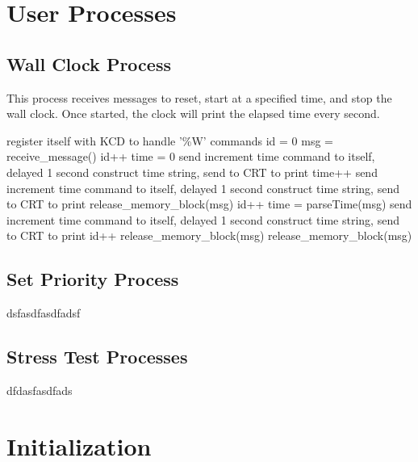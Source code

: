 \documentclass[12pt]{report}
\begin{document}
\section{User Processes}

\subsection{Wall Clock Process}

This process receives messages to reset, start at a specified time, and stop the wall clock. Once started, the clock will print the elapsed time every second.

\begin{algorithmic}[1]
    \State register itself with KCD to handle '\%W' commands
    \State id = 0
      \State msg = receive\_message()
        \State id++
        \State time = 0
        \State send increment time command to itself, delayed 1 second
        \State construct time string, send to CRT to print
          \State time++
          \State send increment time command to itself, delayed 1 second
          \State construct time string, send to CRT to print
        \Else
          \State release\_memory\_block(msg)
        \EndIf
        \State id++
        \State time = parseTime(msg)
        \State send increment time command to itself, delayed 1 second
        \State construct time string, send to CRT to print
        \State id++
        \State release\_memory\_block(msg)
      \Else
        \State release\_memory\_block(msg)
      \EndIf
    \EndWhile
  \EndFunction  
\end{algorithmic}

\subsection{Set Priority Process}

dsfasdfasdfadsf

\subsection{Stress Test Processes}

dfdasfasdfads

\section{Initialization}
\end{document}
